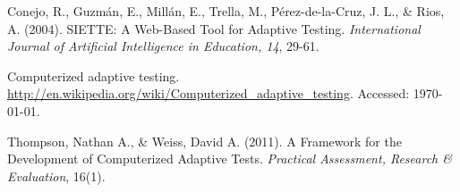 \begin{thebibliography}{9}

 Conejo, R., Guzmán, E., Millán, E., Trella, M., Pérez-de-la-Cruz, J. L., \& Rios, A. (2004). SIETTE: A Web-Based Tool for Adaptive Testing. \textit{International Journal of Artificial Intelligence in Education, 14}, 29-61.

 Computerized adaptive testing. \url{http://en.wikipedia.org/wiki/Computerized_adaptive_testing}. Accessed: \today.

 Thompson, Nathan A., \& Weiss, David A. (2011). A Framework for the Development of Computerized Adaptive Tests. \textit{Practical Assessment, Research \& Evaluation}, 16(1).



\end{thebibliography}